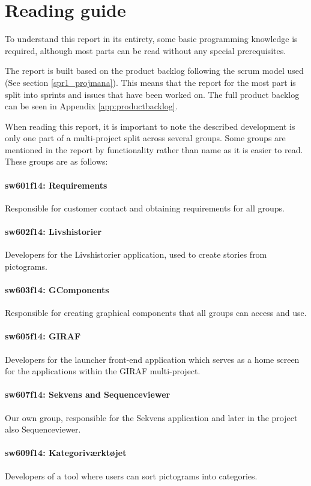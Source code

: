 \section*{Reading guide}

To understand this report in its entirety, some basic programming knowledge is required, although most parts can be read without any special prerequisites.

The report is built based on the product backlog following the scrum model used (See section \ref{spr1_projmana}). This means that the report for the most part is split into sprints and issues that have been worked on. The full product backlog can be seen in Appendix \ref{app:productbacklog}.

When reading this report, it is important to note the  described development is only one part of a multi-project split across several groups. Some groups are mentioned in the report by functionality rather than name as it is easier to read. These groups are as follows:

\paragraph{sw601f14: Requirements}
Responsible for customer contact and obtaining requirements for all groups.
\paragraph{sw602f14: Livshistorier}
Developers for the Livshistorier application, used to create stories from pictograms.
\paragraph{sw603f14: GComponents}
Responsible for creating graphical components that all groups can access and use.
\paragraph{sw605f14: GIRAF}
Developers for the launcher front-end application which serves as a home screen for the applications within the GIRAF multi-project.
\paragraph{sw607f14: Sekvens and Sequenceviewer}
Our own group, responsible for the Sekvens application and later in the project also Sequenceviewer.
\paragraph{sw609f14: Kategoriværktøjet}
Developers of a tool where users can sort pictograms into categories.
